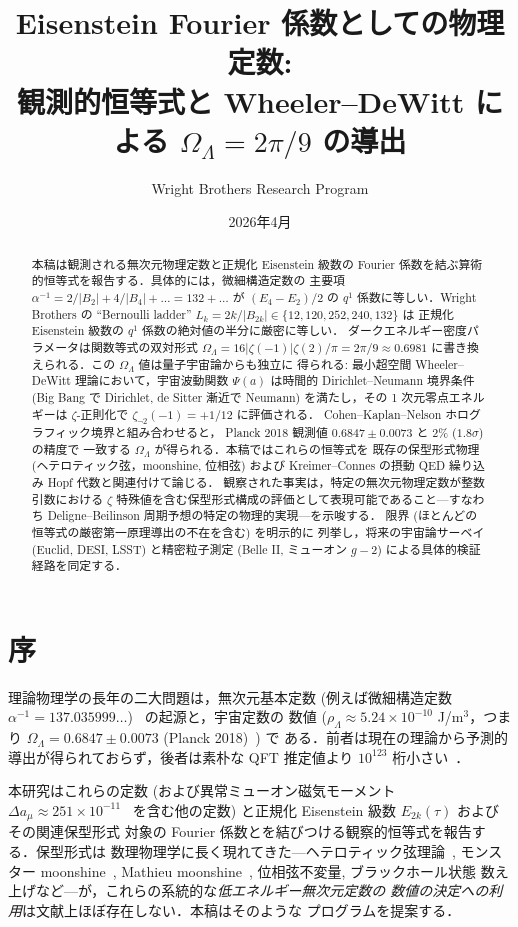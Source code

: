 \documentclass[11pt,a4paper]{article}
\title{Eisenstein Fourier 係数としての物理定数:\\
観測的恒等式と Wheeler--DeWitt による $\Omega_\Lambda = 2\pi/9$ の導出}
\author{Wright Brothers Research Program}
\date{2026年4月}
\begin{document}
\maketitle

\begin{abstract}
本稿は観測される無次元物理定数と正規化 Eisenstein 級数の Fourier
係数を結ぶ算術的恒等式を報告する．具体的には，微細構造定数の
主要項 $\alpha^{-1} = 2/|B_2| + 4/|B_4| + \ldots = 132 + \ldots$ が
$(E_4 - E_2)/2$ の $q^1$ 係数に等しい．Wright Brothers の ``Bernoulli
ladder'' $L_k = 2k/|B_{2k}| \in \{12, 120, 252, 240, 132\}$ は
正規化 Eisenstein 級数の $q^1$ 係数の絶対値の半分に厳密に等しい．
ダークエネルギー密度パラメータは関数等式の双対形式
$\Omega_\Lambda = 16|\zeta(-1)|\zeta(2)/\pi = 2\pi/9 \approx 0.6981$
に書き換えられる．この $\Omega_\Lambda$ 値は量子宇宙論からも独立に
得られる: 最小超空間 Wheeler--DeWitt 理論において，宇宙波動関数
$\Psi(a)$ は時間的 Dirichlet--Neumann 境界条件 (Big Bang で Dirichlet,
de Sitter 漸近で Neumann) を満たし，その 1 次元零点エネルギーは
$\zeta$-正則化で $\zeta_{\neg 2}(-1) = +1/12$ に評価される．
Cohen--Kaplan--Nelson ホログラフィック境界と組み合わせると，
Planck 2018 観測値 $0.6847 \pm 0.0073$ と 2\% ($1.8\sigma$) の精度で
一致する $\Omega_\Lambda$ が得られる．本稿ではこれらの恒等式を
既存の保型形式物理 (ヘテロティック弦，moonshine, 位相弦) および
Kreimer--Connes の摂動 QED 繰り込み Hopf 代数と関連付けて論じる．
観察された事実は，特定の無次元物理定数が整数引数における $\zeta$
特殊値を含む保型形式構成の評価として表現可能であること---すなわち
Deligne--Beilinson 周期予想の特定の物理的実現---を示唆する．
限界 (ほとんどの恒等式の厳密第一原理導出の不在を含む) を明示的に
列挙し，将来の宇宙論サーベイ (Euclid, DESI, LSST) と精密粒子測定
(Belle II, ミューオン $g-2$) による具体的検証経路を同定する．
\end{abstract}

\section{序}

理論物理学の長年の二大問題は，無次元基本定数 (例えば微細構造定数
$\alpha^{-1} = 137.035999\ldots$)~\cite{Mohr2016} の起源と，宇宙定数の
数値 ($\rho_\Lambda \approx 5.24 \times 10^{-10}$ J/m$^3$，つまり
$\Omega_\Lambda = 0.6847 \pm 0.0073$ (Planck 2018)~\cite{Planck2018}) で
ある．前者は現在の理論から予測的導出が得られておらず，後者は素朴な
QFT 推定値より $10^{123}$ 桁小さい~\cite{Weinberg1989}．

本研究はこれらの定数 (および異常ミューオン磁気モーメント
$\Delta a_\mu \approx 251 \times 10^{-11}$~\cite{MuonG2FNAL} を含む他の定数)
と正規化 Eisenstein 級数 $E_{2k}(\tau)$ およびその関連保型形式
対象の Fourier 係数とを結びつける観察的恒等式を報告する．保型形式は
数理物理学に長く現れてきた---ヘテロティック弦理論~\cite{GSW1987},
モンスター moonshine~\cite{Borcherds1992}, Mathieu
moonshine~\cite{EOT2010}, 位相弦不変量, ブラックホール状態
数え上げなど---が，これらの系統的な\emph{低エネルギー無次元定数の
数値の決定への利用}は文献上ほぼ存在しない．本稿はそのような
プログラムを提案する．
\end{document}
